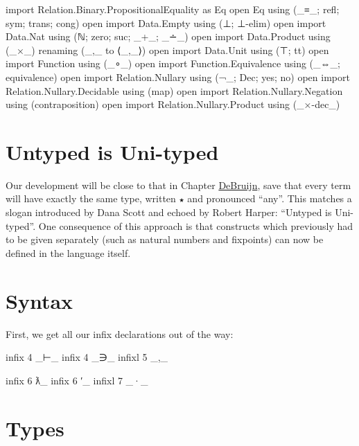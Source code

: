 \begin{fence}
\begin{code}
import Relation.Binary.PropositionalEquality as Eq
open Eq using (_≡_; refl; sym; trans; cong)
open import Data.Empty using (⊥; ⊥-elim)
open import Data.Nat using (ℕ; zero; suc; _+_; _∸_)
open import Data.Product using (_×_) renaming (_,_ to ⟨_,_⟩)
open import Data.Unit using (⊤; tt)
open import Function using (_∘_)
open import Function.Equivalence using (_⇔_; equivalence)
open import Relation.Nullary using (¬_; Dec; yes; no)
open import Relation.Nullary.Decidable using (map)
open import Relation.Nullary.Negation using (contraposition)
open import Relation.Nullary.Product using (_×-dec_)
\end{code}
\end{fence}

\hypertarget{untyped-is-uni-typed}{%
\section{Untyped is Uni-typed}\label{untyped-is-uni-typed}}

Our development will be close to that in Chapter
\protect\hyperlink{DeBruijn}{DeBruijn}, save that every term will have
exactly the same type, written \texttt{★} and pronounced ``any''. This
matches a slogan introduced by Dana Scott and echoed by Robert Harper:
``Untyped is Uni-typed''. One consequence of this approach is that
constructs which previously had to be given separately (such as natural
numbers and fixpoints) can now be defined in the language itself.

\hypertarget{syntax}{%
\section{Syntax}\label{syntax}}

First, we get all our infix declarations out of the way:

\begin{fence}
\begin{code}
infix  4  _⊢_
infix  4  _∋_
infixl 5  _,_

infix  6  ƛ_
infix  6  ′_
infixl 7  _·_
\end{code}
\end{fence}

\hypertarget{types}{%
\section{Types}\label{types}}

